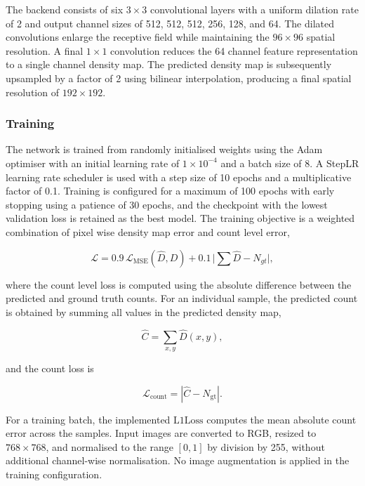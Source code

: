 \documentclass[12pt,a4paper]{report}
\begin{document}
The backend consists of six $3{\times}3$ convolutional layers with a uniform dilation rate of 2 and output channel sizes of 512, 512, 512, 256, 128, and 64. The dilated convolutions enlarge the receptive field while maintaining the $96{\times}96$ spatial resolution. A final $1{\times}1$ convolution reduces the 64 channel feature representation to a single channel density map. The predicted density map is subsequently upsampled by a factor of 2 using bilinear interpolation, producing a final spatial resolution of $192{\times}192$.

\subsubsection{Training}

The network is trained from randomly initialised weights using the Adam optimiser with an initial learning rate of $1\times10^{-4}$ and a batch size of 8. A StepLR learning rate scheduler is used with a step size of 10 epochs and a multiplicative factor of 0.1. Training is configured for a maximum of 100 epochs with early stopping using a patience of 30 epochs, and the checkpoint with the lowest validation loss is retained as the best model. The training objective is a weighted combination of pixel wise density map error and count level error,

\begin{equation}
	\mathcal{L} = 0.9 \, \mathcal{L}_{\text{MSE}}(\hat D, D) + 0.1 \, \bigl|{\textstyle\sum}\hat D - N_{gt}\bigr|,
\end{equation}

where the count level loss is computed using the absolute difference between the predicted and ground truth counts. For an individual sample, the predicted count is obtained by summing all values in the predicted density map,

\begin{equation}
	\hat C=\sum_{x,y}\hat D(x,y),
\end{equation}

and the count loss is

\begin{equation}
	\mathcal{L}_{\text{count}}=|\hat C-N_{\text{gt}}|.
\end{equation}

For a training batch, the implemented $\mathrm{L1Loss}$ computes the mean absolute count error across the samples. Input images are converted to RGB, resized to $768{\times}768$, and normalised to the range $[0,1]$ by division by 255, without additional channel-wise normalisation. No image augmentation is applied in the training configuration.
\end{document}
